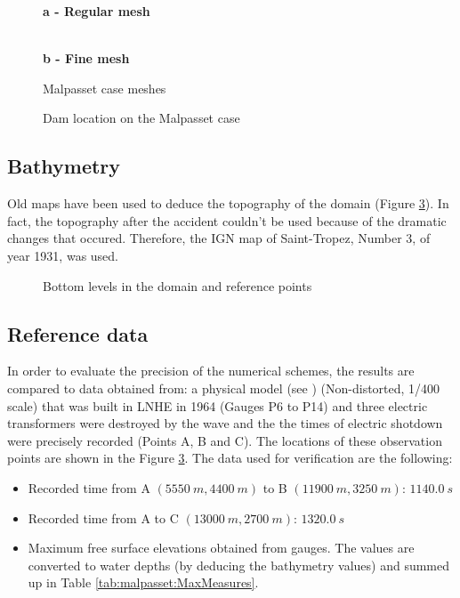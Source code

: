 \begin{figure}[H]
  \centering
  \textbf{a - Regular mesh}\par\medskip
   \\
  \textbf{b - Fine mesh}\par\medskip
  \caption{Malpasset case meshes}\label{fig:malpasset:Mesh}
\end{figure}

\begin{figure}[H] %
  \centering
  \caption{Dam location on the Malpasset case}\label{fig:malpasset:mesh_dam}
\end{figure}

\subsection{Bathymetry}
Old maps have been used to deduce the topography of the domain (Figure \ref{fig:malpasset:bathy}). In fact, the topography after the accident couldn't be used because of the dramatic changes that occured. Therefore, the IGN map of Saint-Tropez, Number 3, of year 1931, was used.

\begin{figure}[H] %
  \centering
  \caption{Bottom levels in the domain and reference points}\label{fig:malpasset:bathy}
\end{figure}

\subsection{Reference data}
In order to evaluate the precision of the numerical schemes, the results are compared to data obtained from:
a physical model (see \cite{Hervouet2007}) (Non-distorted, 1/400 scale) that was built in LNHE in 1964 (Gauges P6 to P14) and
three electric transformers were destroyed by the wave and the the times of electric shotdown were precisely recorded (Points A, B and C).
The locations of these observation points are shown in the Figure \ref{fig:malpasset:bathy}.
The data used for verification are the following:
\begin{itemize}
\item Recorded time from A $(5550~m,4400~m)$ to B $(11900~m,3250~m)$: $1140.0~s$
\item Recorded time from A to C $(13000~m,2700~m)$: $1320.0~s$
\item Maximum free surface elevations obtained from gauges. The values are converted to water depths (by deducing the bathymetry values) and summed up in Table \ref{tab:malpasset:MaxMeasures}.
\end{itemize}

